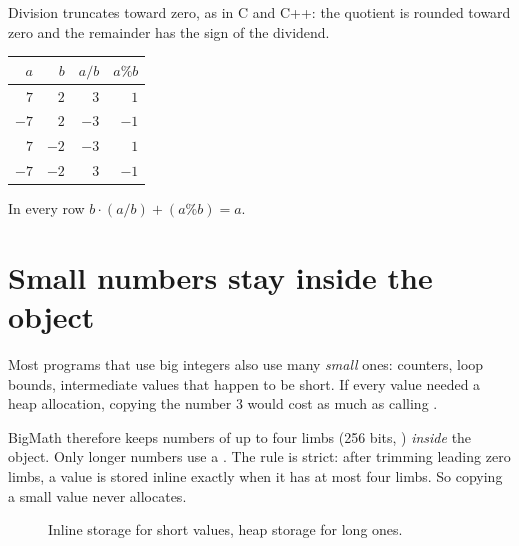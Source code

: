 Division truncates toward zero, as in C and C++: the quotient is rounded toward zero
and the remainder has the sign of the dividend.

\begin{center}
\begin{tabular}{rrrr}
\toprule
$a$ & $b$ & $a / b$ & $a \% b$ \\
\midrule
$7$ & $2$ & $3$ & $1$ \\
$-7$ & $2$ & $-3$ & $-1$ \\
$7$ & $-2$ & $-3$ & $1$ \\
$-7$ & $-2$ & $3$ & $-1$ \\
\bottomrule
\end{tabular}
\end{center}

In every row $b \cdot (a/b) + (a \% b) = a$.

\section{Small numbers stay inside the object}
\label{sec:smallops}

Most programs that use big integers also use many \emph{small} ones: counters,
loop bounds, intermediate values that happen to be short. If every value needed a
heap allocation, copying the number $3$ would cost as much as calling .

BigMath therefore keeps numbers of up to four limbs (256 bits,
) \emph{inside} the  object. Only longer
numbers use a . The rule is strict: after trimming leading zero
limbs, a value is stored inline exactly when it has at most four limbs. So copying a
small value never allocates.

\begin{figure}[ht]
\centering
{}
\caption{Inline storage for short values, heap storage for long ones.}
\end{figure}

